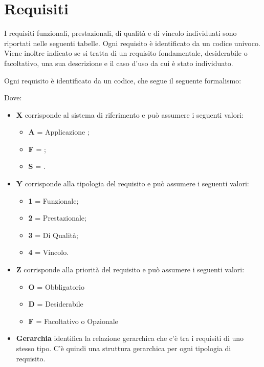 \section{Requisiti }
I requisiti funzionali, prestazionali, di qualità e di vincolo individuati sono riportati nelle seguenti tabelle. Ogni requisito è identificato da un codice univoco.
Viene inoltre indicato se si tratta di un requisito fondamentale, desiderabile o facoltativo, una sua descrizione e il caso d'uso da cui è stato individuato. 

Ogni requisito è identificato da un codice, che segue il seguente formalismo:
\begin{center}
\end{center}

Dove:
\begin{itemize}
 \item \textbf{X} corrisponde al sistema di riferimento e può assumere i seguenti valori:
    \begin{itemize}
     \item[] \textbf{A} = Applicazione ;
     \item[] \textbf{F} = ;
     \item[] \textbf{S} = .
    \end{itemize}

 \item \textbf{Y} corrisponde alla tipologia del requisito e può assumere i seguenti valori:
    \begin{itemize}
     \item[] \textbf{1} = Funzionale;
     \item[] \textbf{2} = Prestazionale;
     \item[] \textbf{3} = Di Qualità;
     \item[] \textbf{4} = Vincolo.
    \end{itemize}

 \item \textbf{Z} corrisponde alla priorità del requisito e può assumere i seguenti valori:
    \begin{itemize}
     \item[] \textbf{O} = Obbligatorio
     \item[] \textbf{D} = Desiderabile
     \item[] \textbf{F} = Facoltativo o Opzionale
    \end{itemize}

 \item \textbf{Gerarchia} identifica la relazione gerarchica che c'è tra i requisiti di uno stesso tipo. C'è quindi una struttura gerarchica per ogni tipologia di requisito.
\end{itemize}

